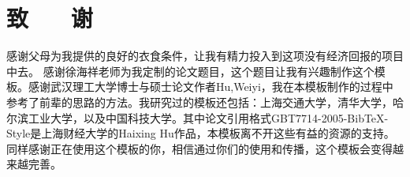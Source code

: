 \section*{致 ~~ 谢}
感谢父母为我提供的良好的衣食条件，让我有精力投入到这项没有经济回报的项目中去。
感谢徐海祥老师为我定制的论文题目，这个题目让我有兴趣制作这个模板。感谢武汉理工大学博士与硕士论文作者Hu,Weiyi，我在本模板制作的过程中参考了前辈的思路的方法。我研究过的模板还包括：上海交通大学，清华大学，哈尔滨工业大学，以及中国科技大学。其中论文引用格式GBT7714-2005-BibTeX-Style是上海财经大学的Haixing Hu作品，本模板离不开这些有益的资源的支持。同样感谢正在使用这个模板的你，相信通过你们的使用和传播，这个模板会变得越来越完善。